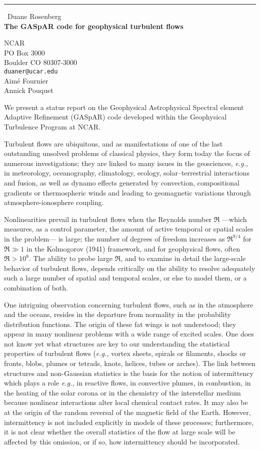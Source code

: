 \documentclass{report}
\begin{document}
\begin{center}
\rule{6in}{1pt} \
{\large Duane Rosenberg \\
{\bf The GASpAR code for geophysical turbulent flows}}

NCAR \\ PO Box 3000 \\ Boulder CO 80307-3000
\\
{\tt duaner@ucar.edu}\\
Aim\'e Fournier\\
Annick Pouquet\end{center}

We present a status report on the Geophysical Astrophysical Spectral element
Adaptive Refinement (GASpAR) code developed within the Geophysical
Turbulence Program at NCAR.

Turbulent flows are ubiquitous, and as manifestations of one of the
last outstanding unsolved problems of classical physics, they form
today the focus of numerous investigations; they
are linked to many issues in the geosciences, {\it e.g.,} in meteorology,
oceanography, climatology, ecology, solar--terrestrial interactions
and fusion, as well as dynamo effects generated by convection, compositional
gradients or thermospheric winds and leading to geomagnetic variations
through
atmosphere-ionosphere coupling.

Nonlinearities prevail in turbulent flows when the
Reynolds number $\Re$ ---which measures, as a control parameter,
the amount of active temporal or spatial scales in the
problem--- is large; the number of degrees of freedom increases as
$\Re^{9/4}$ for $\Re\gg1$ in the Kolmogorov (1941) framework,
and for geophysical flows, often $\Re> 10^8$.
The ability to probe large $\Re$, and to examine in detail the
large-scale behavior of turbulent flows, depends
critically on the ability to resolve adequately such a large number of
spatial and temporal scales, or else to model them, or a combination of both.

One intriguing observation concerning turbulent flows, such as in the
atmosphere and the oceans, resides in the
departure from normality in the probability distribution
functions. The origin of these fat wings is not understood;
they appear in many nonlinear problems with a wide range of excited
scales. One does not know yet what structures are key to our
understanding the statistical properties of turbulent flows ({\it e.g.,}
vortex sheets, spirals or filaments,
shocks or fronts, blobs, plumes or tetrads, knots, helices, tubes or
arches).
The link between structures and non-Gaussian statistics is the basis
for the notion of intermittency which plays a role {\it e.g.,} in
reactive flows, in convective plumes, in combustion, in the heating of
the solar corona or in the chemistry of the interstellar medium because
nonlinear interactions alter local chemical contact rates. It may also be at
the origin of the random reversal of the magnetic field of the Earth.
However,
intermittency is not included explicitly in models of these processes;
furthermore, it is not clear whether the overall statistics of the flow at
large scale will be affected by this omission, or if so, how
intermittency should be incorporated.
\end{document}
